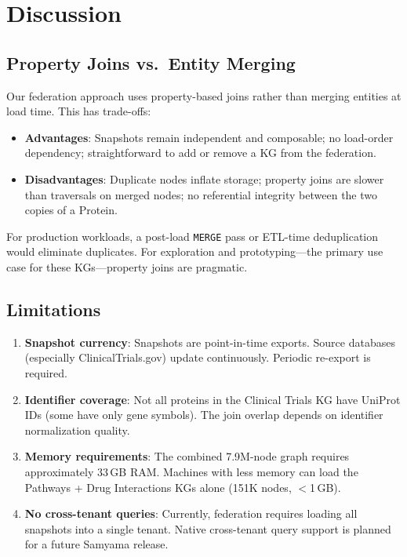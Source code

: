 \documentclass[11pt]{article}
\begin{document}
\section{Discussion}

\subsection{Property Joins vs.\ Entity Merging}

Our federation approach uses property-based joins rather than merging entities at load time. This has trade-offs:

\begin{itemize}[leftmargin=*]
  \item \textbf{Advantages}: Snapshots remain independent and composable; no load-order dependency; straightforward to add or remove a KG from the federation.
  \item \textbf{Disadvantages}: Duplicate nodes inflate storage; property joins are slower than traversals on merged nodes; no referential integrity between the two copies of a Protein.
\end{itemize}

For production workloads, a post-load \texttt{MERGE} pass or ETL-time deduplication would eliminate duplicates. For exploration and prototyping---the primary use case for these KGs---property joins are pragmatic.

\subsection{Limitations}

\begin{enumerate}[leftmargin=*]
  \item \textbf{Snapshot currency}: Snapshots are point-in-time exports. Source databases (especially ClinicalTrials.gov) update continuously. Periodic re-export is required.
  \item \textbf{Identifier coverage}: Not all proteins in the Clinical Trials KG have UniProt IDs (some have only gene symbols). The join overlap depends on identifier normalization quality.
  \item \textbf{Memory requirements}: The combined 7.9M-node graph requires approximately 33\,GB RAM. Machines with less memory can load the Pathways + Drug Interactions KGs alone (151K nodes, $<$1\,GB).
  \item \textbf{No cross-tenant queries}: Currently, federation requires loading all snapshots into a single tenant. Native cross-tenant query support is planned for a future Samyama release.
\end{enumerate}
\end{document}
